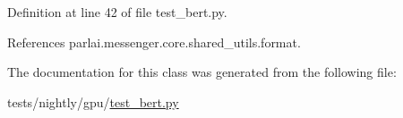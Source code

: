 Definition at line 42 of file test\+\_\+bert.\+py.



References parlai.\+messenger.\+core.\+shared\+\_\+utils.\+format.



The documentation for this class was generated from the following file\+:\begin{DoxyCompactItemize}
\item 
tests/nightly/gpu/\hyperlink{test__bert_8py}{test\+\_\+bert.\+py}\end{DoxyCompactItemize}
